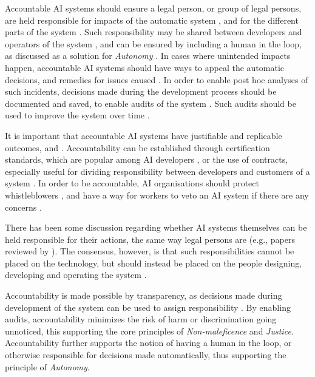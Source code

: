 Accountable AI systems should ensure a legal person, or group of legal persons, are held responsible for impacts of the automatic system \parencite{Werder_2022,Vakkuri_2022}, and for the different parts of the system \parencite{Lu_2022}. Such responsibility may be shared between developers and operators of the system \parencite{Vakkuri_2022}, and can be ensured by including a human in the loop, as discussed as a solution for \textit{Autonomy} \parencite{Doorn_2021}. In cases where unintended impacts happen, accountable AI systems should have ways to appeal the automatic decisions, and remedies for issues caused \parencite{Fjeld_2020,Eitel-Porter_2021,Clarke_2019}. In order to enable post hoc analyses of such incidents, decisions made during the development process should be documented and saved, to enable audits of the system \parencite{Rizinski_2022,Havrda_2020,BarredoArrieta_2020}. Such audits should be used to improve the system over time \parencite{Fjeld_2020}.

It is important that accountable AI systems have justifiable \parencite{Kumar_2021} and replicable \parencite{Fjeld_2020} outcomes,  \parencite[p.~3]{Merhi_2022} and  \parencite[p.~5]{Dignum_2017}.  Accountability can be established through certification standards, which are popular among AI developers \parencite{Henriksen_2021}, or the use of contracts, especially useful for dividing responsibility between developers and customers of a system \parencite{Vakkuri_2022,Jobin_2019}. In order to be accountable, AI organisations should protect whistleblowers \parencite{Jobin_2019}, and have a way for workers to veto an AI system if there are any concerns \parencite{Anagnostou_2022}.

There has been some discussion regarding whether AI systems themselves can be held responsible for their actions, the same way legal persons are (e.g., papers reviewed by \cite{Jobin_2019}). The consensus, however, is that such responsibilities cannot be placed on the technology, but should instead be placed on the people designing, developing and operating the system \parencite{Fjeld_2020,Doorn_2021,Anagnostou_2022}.

Accountability is made possible by transparency, as decisions made during development of the system can be used to assign responsibility \parencite{Vakkuri_2022}. By enabling audits, accountability minimizes the risk of harm or discrimination going unnoticed, this supporting the core principles of \textit{Non-maleficence} and \textit{Justice}. Accountability further supports the notion of having a human in the loop, or otherwise responsible for decisions made automatically, thus supporting the principle of \textit{Autonomy}.



